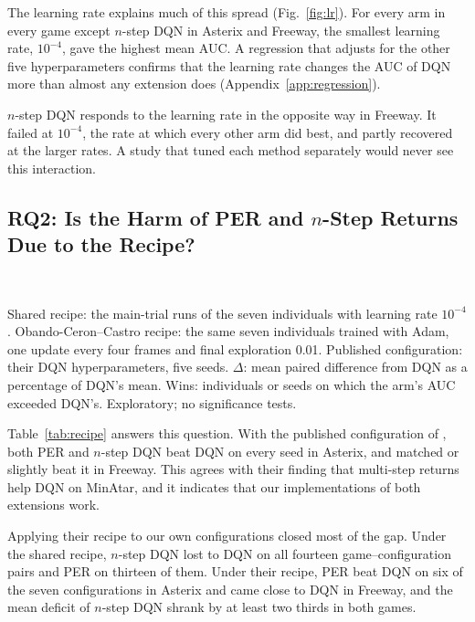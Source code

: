 \documentclass[conference,a4paper]{IEEEtran}
\newcommand{\fresults}{../analysis_output/followup-02/report}
\begin{document}
The learning rate explains much of this spread (Fig.~\ref{fig:lr}). For every arm in every game except $n$-step DQN in
Asterix and Freeway, the smallest learning rate, $10^{-4}$, gave the highest mean AUC. A regression that adjusts for the
other five hyperparameters confirms that the learning rate changes the AUC of DQN more than almost any extension
does (Appendix~\ref{app:regression}).

$n$-step DQN responds to the learning rate in the opposite way in Freeway. It failed at $10^{-4}$, the rate at which every
other arm did best, and partly recovered at the larger rates. A study that tuned each method separately would never see
this interaction.

\subsection{RQ2: Is the Harm of PER and $n$-Step Returns Due to the Recipe?}\label{sec:recipe}

\begin{table}[t]
\caption{DQN, PER and $n$-Step DQN Under the Shared Recipe and the Recipe of \citet{obandoceron2021revisiting} (Mean AUC, $10^{6}$)}
\label{tab:recipe}
\centering
\footnotesize
\setlength{\tabcolsep}{4.5pt}
\\[3pt]
\parbox{\textwidth}{\scriptsize Shared recipe: the main-trial runs of the seven individuals with learning rate
$10^{-4}$. Obando-Ceron--Castro recipe: the same seven individuals trained with Adam, one update every four frames and
final exploration 0.01. Published configuration: their DQN hyperparameters, five seeds. $\Delta$: mean paired difference
from DQN as a percentage of DQN's mean. Wins: individuals or seeds on which the arm's AUC exceeded DQN's. Exploratory;
no significance tests.}
\end{table}

Table~\ref{tab:recipe} answers this question. With the published configuration of \citet{obandoceron2021revisiting}, both
PER and $n$-step DQN beat DQN on every seed in Asterix, and matched or slightly beat it in Freeway. This agrees with their
finding that multi-step returns help DQN on MinAtar, and it indicates that our implementations of both extensions
work.

Applying their recipe to our own configurations closed most of the gap. Under the shared recipe, $n$-step DQN lost to
DQN on all fourteen game--configuration pairs and PER on thirteen of them. Under their recipe, PER beat DQN on six of the
seven configurations in Asterix and came close to DQN in Freeway, and the mean deficit of $n$-step DQN shrank by at
least two thirds in both games.
\end{document}
